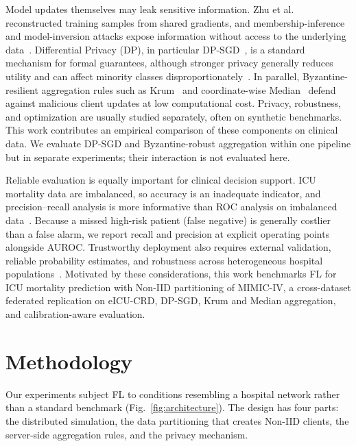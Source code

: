 \documentclass[journal]{IEEEtran}
\begin{document}
Model updates themselves may leak sensitive information. Zhu et al.~\cite{zhu2019deep} reconstructed training samples from shared gradients, and membership-inference and model-inversion attacks expose information without access to the underlying data~\cite{shokri2016membership,fredrikson2014privacy}. Differential Privacy (DP), in particular DP-SGD~\cite{abadi2016deep,dwork2014algorithmic}, is a standard mechanism for formal guarantees, although stronger privacy generally reduces utility and can affect minority classes disproportionately~\cite{bagdasaryan2019differential}. In parallel, Byzantine-resilient aggregation rules such as Krum~\cite{blanchard2017machine} and coordinate-wise Median~\cite{yin2018byzantine} defend against malicious client updates at low computational cost. Privacy, robustness, and optimization are usually studied separately, often on synthetic benchmarks. This work contributes an empirical comparison of these components on clinical data. We evaluate DP-SGD and Byzantine-robust aggregation within one pipeline but in separate experiments; their interaction is not evaluated here.

Reliable evaluation is equally important for clinical decision support. ICU mortality data are imbalanced, so accuracy is an inadequate indicator, and precision--recall analysis is more informative than ROC analysis on imbalanced data~\cite{saito2015precision}. Because a missed high-risk patient (false negative) is generally costlier than a false alarm, we report recall and precision at explicit operating points alongside AUROC. Trustworthy deployment also requires external validation, reliable probability estimates, and robustness across heterogeneous hospital populations~\cite{wiens2019do}. Motivated by these considerations, this work benchmarks FL for ICU mortality prediction with Non-IID partitioning of MIMIC-IV, a cross-dataset federated replication on eICU-CRD, DP-SGD, Krum and Median aggregation, and calibration-aware evaluation.

\section{Methodology}
\label{sec:method}

Our experiments subject FL to conditions resembling a hospital network rather than a standard benchmark (Fig.~\ref{fig:architecture}). The design has four parts: the distributed simulation, the data partitioning that creates Non-IID clients, the server-side aggregation rules, and the privacy mechanism.
\end{document}
